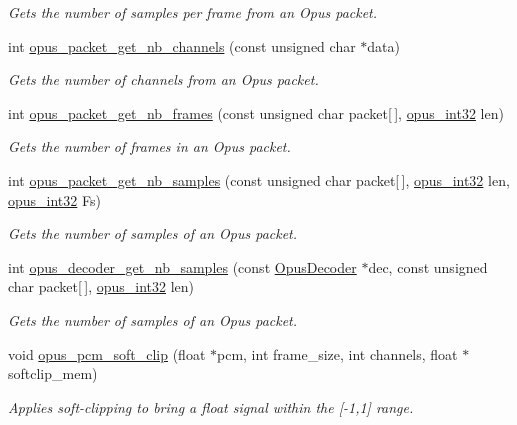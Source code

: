 \begin{DoxyCompactItemize}
\begin{DoxyCompactList}\small\item\em Gets the number of samples per frame from an Opus packet. \end{DoxyCompactList}\item 
int \hyperlink{group__opus__decoder_ga4209376ddf8cc3379767e1749e1ef26d}{opus\+\_\+packet\+\_\+get\+\_\+nb\+\_\+channels} (const unsigned char $\ast$data)
\begin{DoxyCompactList}\small\item\em Gets the number of channels from an Opus packet. \end{DoxyCompactList}\item 
int \hyperlink{group__opus__decoder_ga064cb2ed9e77a934cd7db6c13b02c584}{opus\+\_\+packet\+\_\+get\+\_\+nb\+\_\+frames} (const unsigned char packet\mbox{[}$\,$\mbox{]}, \hyperlink{opus__types_8h_aa4d309d6f80b99dbabebc8f98879ab9a}{opus\+\_\+int32} len)
\begin{DoxyCompactList}\small\item\em Gets the number of frames in an Opus packet. \end{DoxyCompactList}\item 
int \hyperlink{group__opus__decoder_ga3cfec8b0bed7789ebd88c3b3370d337b}{opus\+\_\+packet\+\_\+get\+\_\+nb\+\_\+samples} (const unsigned char packet\mbox{[}$\,$\mbox{]}, \hyperlink{opus__types_8h_aa4d309d6f80b99dbabebc8f98879ab9a}{opus\+\_\+int32} len, \hyperlink{opus__types_8h_aa4d309d6f80b99dbabebc8f98879ab9a}{opus\+\_\+int32} Fs)
\begin{DoxyCompactList}\small\item\em Gets the number of samples of an Opus packet. \end{DoxyCompactList}\item 
int \hyperlink{group__opus__decoder_ga659135a16060f85908f63443a2325118}{opus\+\_\+decoder\+\_\+get\+\_\+nb\+\_\+samples} (const \hyperlink{group__opus__decoder_ga401d8579958d36094715a6b90cd159a6}{Opus\+Decoder} $\ast$dec, const unsigned char packet\mbox{[}$\,$\mbox{]}, \hyperlink{opus__types_8h_aa4d309d6f80b99dbabebc8f98879ab9a}{opus\+\_\+int32} len)
\begin{DoxyCompactList}\small\item\em Gets the number of samples of an Opus packet. \end{DoxyCompactList}\item 
void \hyperlink{group__opus__decoder_gaff99598b352e8939dded08d96e125e0b}{opus\+\_\+pcm\+\_\+soft\+\_\+clip} (float $\ast$pcm, int frame\+\_\+size, int channels, float $\ast$softclip\+\_\+mem)
\begin{DoxyCompactList}\small\item\em Applies soft-\/clipping to bring a float signal within the \mbox{[}-\/1,1\mbox{]} range. \end{DoxyCompactList}\end{DoxyCompactItemize}


